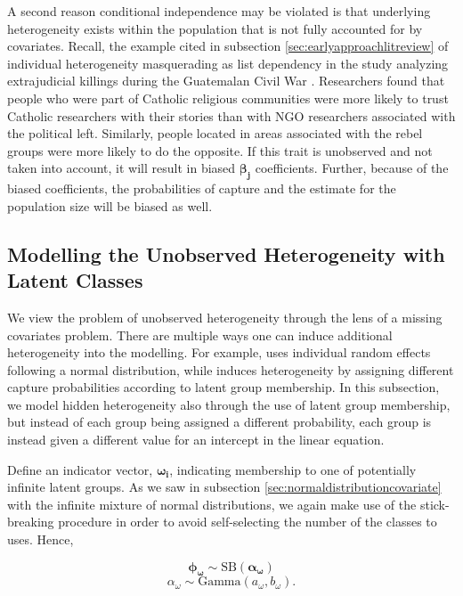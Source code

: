 \documentclass[
  12pt,
]{article}
\begin{document}
A second reason conditional independence may be violated is that
underlying heterogeneity exists within the population that is not fully
accounted for by covariates. Recall, the example cited in subsection
\ref{sec:earlyapproachlitreview} of individual heterogeneity
masquerading as list dependency in the study analyzing extrajudicial
killings during the Guatemalan Civil War \citep{ball_making_2000}.
Researchers found that people who were part of Catholic religious
communities were more likely to trust Catholic researchers with their
stories than with NGO researchers associated with the political left.
Similarly, people located in areas associated with the rebel groups were
more likely to do the opposite. If this trait is unobserved and not
taken into account, it will result in biased \(\boldsymbol{\beta_j}\)
coefficients. Further, because of the biased coefficients, the
probabilities of capture and the estimate for the population size will
be biased as well.

\subsection{Modelling the Unobserved Heterogeneity with Latent Classes}

We view the problem of unobserved heterogeneity through the lens of a
missing covariates problem. There are multiple ways one can induce
additional heterogeneity into the modelling. For example,
\cite{king_bayesian_2008} uses individual random effects following a
normal distribution, while \cite{manriquevallier_bayesian_2016} induces
heterogeneity by assigning different capture probabilities according to
latent group membership. In this subsection, we model hidden
heterogeneity also through the use of latent group membership, but
instead of each group being assigned a different probability, each group
is instead given a different value for an intercept in the linear
equation.

Define an indicator vector, \(\boldsymbol{\omega_i}\), indicating
membership to one of potentially infinite latent groups. As we saw in
subsection \ref{sec:normaldistributioncovariate} with the infinite
mixture of normal distributions, we again make use of the stick-breaking
procedure in order to avoid self-selecting the number of the classes to
uses. Hence,

\vspace{-10px}

\begin{equation}
\boldsymbol{\phi_\omega}\sim \text{SB}(\boldsymbol{\alpha_\omega})
\end{equation} \begin{equation}
\alpha_\omega \sim \text{Gamma}(a_\omega,b_\omega).
\end{equation}
\end{document}
